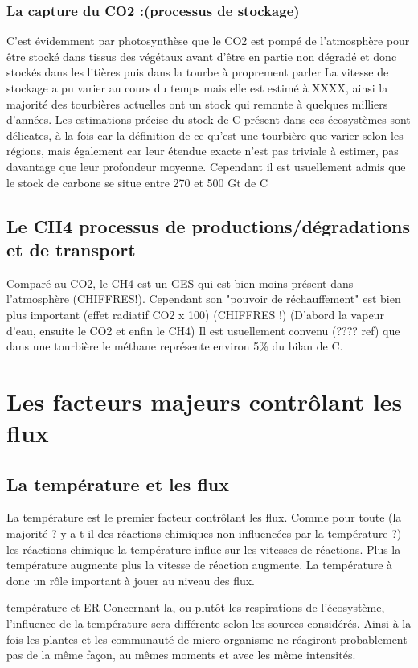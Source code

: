 \subsubsection{La capture du CO2 :(processus de stockage)}
C'est évidemment par photosynthèse que le CO2 est pompé de l'atmosphère pour être stocké dans tissus des végétaux avant d'être en partie non dégradé et donc stockés dans les litières puis dans la tourbe à proprement parler
La vitesse de stockage a pu varier au cours du temps mais elle est estimé à XXXX, ainsi la majorité des tourbières actuelles ont un stock qui remonte à quelques milliers d'années.
Les estimations précise du stock de C présent dans ces écosystèmes sont délicates, à la fois car la définition de ce qu'est une tourbière que varier selon les régions, mais également car leur étendue exacte n'est pas triviale à estimer, pas davantage que leur profondeur moyenne.
Cependant il est usuellement admis que le stock de carbone se situe entre 270 et 500 Gt de C

\subsection{Le CH4 processus de productions/dégradations et de transport}
Comparé au CO2, le CH4 est un GES qui est bien moins présent dans l'atmosphère (CHIFFRES!).
Cependant son "pouvoir de réchauffement" est bien plus important (effet radiatif CO2 x 100) (CHIFFRES !) (D'abord la vapeur d'eau, ensuite le CO2 et enfin le CH4)
Il est usuellement convenu (???? ref) que dans une tourbière le méthane représente environ 5\% du bilan de C.

\section{Les facteurs majeurs contrôlant les flux}
\subsection{La température et les flux}
La température est le premier facteur contrôlant les flux.
Comme pour toute (la majorité ? y a-t-il des réactions chimiques non influencées par la température ?) les réactions chimique la température influe sur les vitesses de réactions. 
Plus la température augmente plus la vitesse de réaction augmente.
La température à donc un rôle important à jouer au niveau des flux.

température et ER
Concernant la, ou plutôt les respirations de l'écosystème, l'influence de la température sera différente selon les sources considérés.
Ainsi à la fois les plantes et les communauté de micro-organisme ne réagiront probablement pas de la même façon, au mêmes moments et avec les même intensités.

